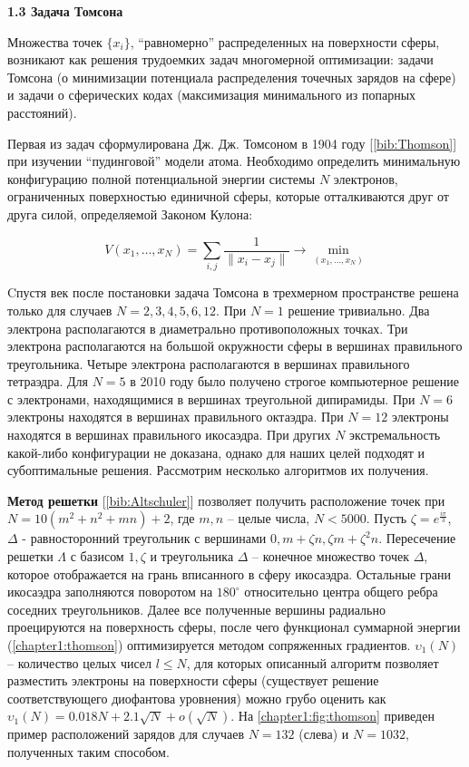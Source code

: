 \vspace{5pt}
\textbf{1.3 Задача Томсона}\label{chapters:1.3}
\vspace{5pt}

Множества точек $\{ x_i \}$, \enquote{равномерно} распределенных на поверхности сферы, возникают как решения трудоемких задач многомерной оптимизации: задачи Томсона (о минимизации потенциала распределения точечных зарядов на сфере) и задачи о сферических кодах (максимизация минимального из попарных расстояний). 

Первая из задач сформулирована Дж. Дж. Томсоном в 1904 году [\ref{bib:Thomson}] при изучении \enquote{пудинговой} модели атома. 
Необходимо определить минимальную конфигурацию полной потенциальной энергии системы $N$ электронов, ограниченных поверхностью единичной сферы, которые отталкиваются друг от друга силой, определяемой Законом Кулона:

\begin{equation}\label{chapter1:thomson}
V(x_1, \dots, x_N) = \sum\limits_{i,j} \frac{1}{ \|x_i-x_j\| } \to \min\limits_{(x_1, \dots, x_N)}
\end{equation}

Cпустя век после постановки задача Томсона в трехмерном пространстве решена только для случаев 
$N = 2, 3, 4, 5, 6, 12$. 
При $N = 1$ решение тривиально. 
Два электрона располагаются в диаметрально противоположных точках.
Три электрона располагаются на большой окружности сферы в вершинах правильного треугольника.
Четыре электрона располагаются в вершинах правильного тетраэдра.
Для $N = 5$ в 2010 году было получено строгое компьютерное решение с электронами, находящимися в вершинах треугольной дипирамиды.
При $N = 6$ электроны находятся в вершинах правильного октаэдра.
При $N = 12$ электроны находятся в вершинах правильного икосаэдра.
При других $N$ экстремальность какой-либо конфигурации не доказана, 
однако для наших целей подходят и субоптимальные решения. Рассмотрим несколько алгоритмов их получения.

\textbf{Метод решетки} [\ref{bib:Altschuler}] позволяет получить расположение точек при $N = 10(m^2 + n^2 + mn) + 2$, 
где $m,n$ -- целые числа, $N < 5000$. 
Пусть $\zeta = e^{\frac{i\pi}{3}}$, $\Delta$ - 
равносторонний треугольник с вершинами $0, m + \zeta n, \zeta m + \zeta^2 n$. Пересечение решетки $\Lambda$ с базисом $1, \zeta$ 
и треугольника $\Delta$ -- конечное множество точек $\Delta$, которое отображается на грань вписанного в сферу икосаэдра. 
Остальные грани икосаэдра заполняются поворотом на $180^{\circ}$ относительно центра общего ребра соседних треугольников. 
Далее все полученные вершины радиально проецируются на поверхность сферы, после чего функционал суммарной энергии 
(\ref{chapter1:thomson}) оптимизируется методом сопряженных градиентов. 
$\upsilon_1(N)$ -- количество целых чисел $l \le N$, для которых описанный алгоритм позволяет разместить электроны 
на поверхности сферы (существует решение соответствующего диофантова уровнения) можно грубо оценить как
$\upsilon_1(N) = 0.018N + 2.1\sqrt{N} + o(\sqrt{N})$.
На \figurename{ \ref{chapter1:fig:thomson}} приведен пример расположений зарядов для случаев $N=132$ (слева) и $N=1032$, полученных таким способом.

